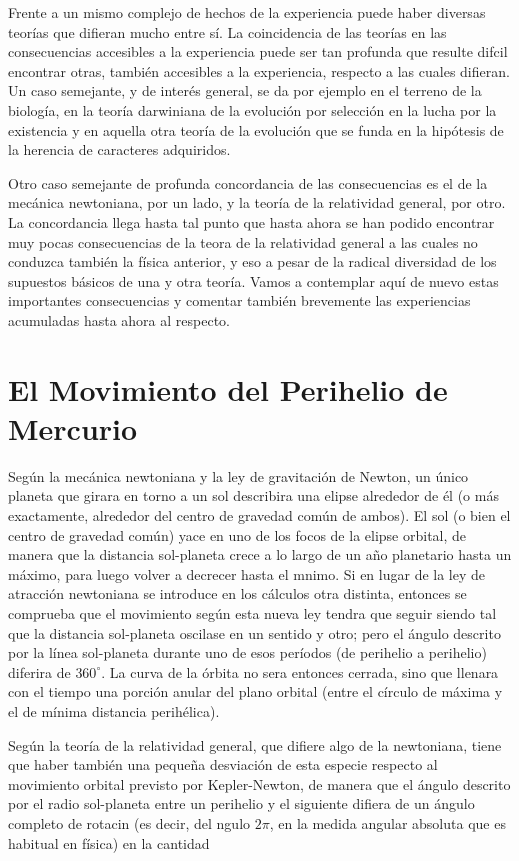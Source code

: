 \documentclass[spanish]{book}
\begin{document}
Frente a un mismo complejo de hechos de la experiencia puede haber diversas
teorías que difieran mucho entre sí. La coincidencia de las teorías en las consecuencias
accesibles a la experiencia puede ser tan profunda que resulte difcil encontrar otras,
también accesibles a la experiencia, respecto a las cuales difieran. Un caso semejante,
y de interés general, se da por ejemplo en el terreno de la biología, en la teoría
darwiniana de la evolución por selección en la lucha por la existencia y en aquella
otra teoría de la evolución que se funda en la hipótesis de la herencia de caracteres
adquiridos.

Otro caso semejante de profunda concordancia de las consecuencias es el de la
mecánica newtoniana, por un lado, y la teoría de la relatividad general, por otro. La
concordancia llega hasta tal punto que hasta ahora se han podido encontrar muy pocas
consecuencias de la teora de la relatividad general a las cuales no conduzca también la
física anterior, y eso a pesar de la radical diversidad de los supuestos básicos de una y
otra teoría. Vamos a contemplar aquí de nuevo estas importantes consecuencias y
comentar también brevemente las experiencias acumuladas hasta ahora al respecto.


\section{El Movimiento del Perihelio de Mercurio}

Según la mecánica newtoniana y la ley de gravitación de Newton, un único planeta
que girara en torno a un sol describira una elipse alrededor de él (o más exactamente,
alrededor del centro de gravedad común de ambos). El sol (o bien el centro de
gravedad común) yace en uno de los focos de la elipse orbital, de manera que la
distancia sol-planeta crece a lo largo de un año planetario hasta un máximo, para luego
volver a decrecer hasta el mnimo. Si en lugar de la ley de atracción newtoniana se
introduce en los cálculos otra distinta, entonces se comprueba que el movimiento
según esta nueva ley tendra que seguir siendo tal que la distancia sol-planeta
oscilase en un sentido y otro; pero el ángulo descrito por la línea sol-planeta
durante uno de esos períodos (de perihelio a perihelio) diferira de $360^{\circ}$. La curva de
la órbita no sera entonces cerrada, sino que llenara con el tiempo una porción anular
del plano orbital (entre el círculo de máxima y el de mínima distancia perihélica).

Según la teoría de la relatividad general, que difiere algo de la newtoniana, tiene
que haber también una pequeña desviación de esta especie respecto al movimiento
orbital previsto por Kepler-Newton, de manera que el ángulo descrito por el radio
sol-planeta entre un perihelio y el siguiente difiera de un ángulo completo de
rotacin (es decir, del ngulo $2\pi$, en la medida angular absoluta que es habitual en
física) en la cantidad
\end{document}
